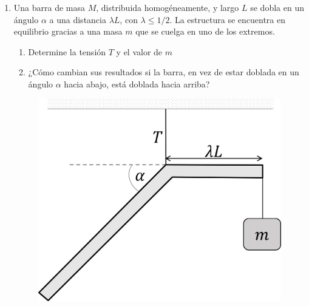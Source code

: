 \documentclass[letterpaper,11pt]{article}
\begin{document}
\begin{enumerate}
\item 
\begin{multicols}{2} Una barra de masa $M$, distribuida homogéneamente, y largo $L$ se dobla en un ángulo $\alpha$ a una distancia $\lambda L$, con $\lambda \leq 1/2$. La estructura se encuentra en equilibrio gracias a una masa $m$ que se cuelga en uno de los extremos.
    \begin{enumerate}
        \item Determine la tensión $T$ y el valor de $m$
        
        \item ¿Cómo cambian sus resultados si la barra, en vez de estar doblada en un ángulo $\alpha$ hacia abajo, está doblada hacia arriba?
    \end{enumerate}
    
    \columnbreak
    
    \begin{figure}[H]
        \centering
        \includegraphics[width=0.6\linewidth]{2022-1/img/aux12/barra_dobla.png}
    \end{figure}
\end{multicols}

%   

\end{enumerate}
\end{document}
